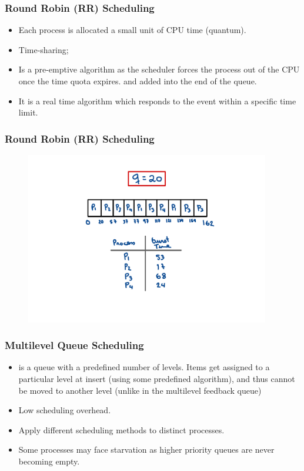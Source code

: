 \begin{frame}
    \frametitle{Round Robin (RR) Scheduling}

    
    \begin{itemize}
        \item Each process is allocated a small unit of CPU time (quantum).
        \item Time-sharing;
        \item Is a pre-emptive algorithm as the scheduler forces the process out of the CPU once the time quota expires.
        and added into the end of the queue.
        \item It is a real time algorithm which responds to the event within a specific time limit.
    \end{itemize}


\end{frame}

\begin{frame}
    \frametitle{Round Robin (RR) Scheduling}
    \begin{figure}
        \centering
        \includegraphics[width=0.95\textwidth]{slides/figures/round_robin_example.pdf}
    \end{figure}
\end{frame}



\begin{frame}
    \frametitle{Multilevel Queue Scheduling}
    \begin{itemize}

        \item is a queue with a predefined number of levels. Items get assigned to a particular level at 
        insert (using some predefined algorithm), and thus cannot be moved to another level (unlike in the multilevel feedback queue)

        \item Low scheduling overhead.

        \item Apply different scheduling methods to distinct processes.

        \item Some processes may face starvation as higher priority queues are never becoming empty.

    \end{itemize}
\end{frame}


